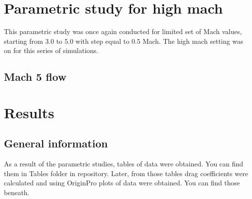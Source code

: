 \documentclass{article}
\begin{document}
\section{Parametric study for high mach}
This parametric study was once again conducted for limited set of Mach values, starting from 3.0 to 5.0 with step equal to 0.5 Mach. The high mach setting was on for this series of simulations.

\subsection{Mach 5 flow}

\section{Results}
\subsection{General information}
As a result of the parametric studies, tables of data were obtained. You can find them in Tables folder in repository. Later, from those tables drag coefficients were calculated and using OriginPro plots of data were obtained. You can find those beneath. 
\end{document}
